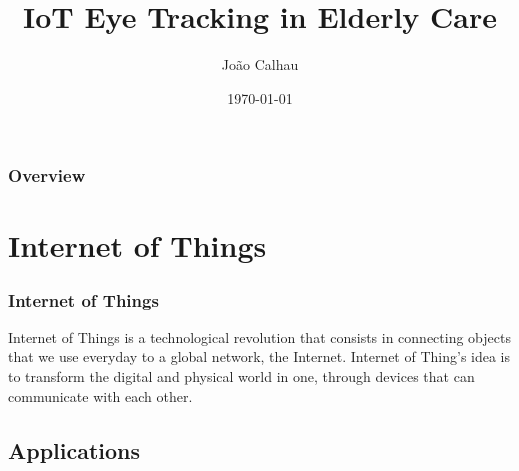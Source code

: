 \documentclass{beamer}
\title[]{IoT Eye Tracking in Elderly Care} %
\author{João Calhau} %
\institute[UE] %
{
University of Évora \\ %
\medskip
\textit{m36764@alunos.uevora.pt} %
}
\date{\today} %
\begin{document}
\begin{frame}
\titlepage %
\end{frame}

\begin{frame}
\frametitle{Overview} %
\tableofcontents %
\end{frame}


\section{Internet of Things} %

\begin{frame}
\frametitle{Internet of Things}
Internet of Things is a technological revolution that consists in connecting objects that we use everyday to a global network, the Internet. Internet of Thing's idea is to transform the digital and physical world in one, through devices that can communicate with each other.
\end{frame}


\subsection{Applications} %

\end{document}
